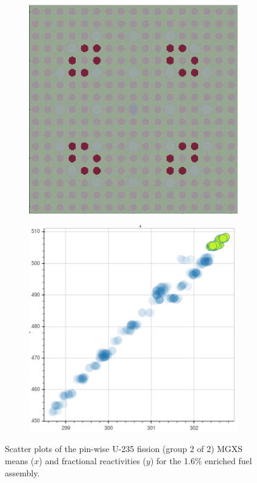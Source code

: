 \begin{figure}[h!]
\begin{subfigure}{0.45\textwidth}
  \caption{}
  \label{fig:chap10-fiss-mean-pcm-mgxs-2}
\end{subfigure}
\begin{subfigure}{0.45\textwidth}
  \centering
  \includegraphics[width=0.9\linewidth]{figures/unsupervised/features/assm-16/u235-fiss/mean-pcm/geometry-3}
  \caption{}
  \label{fig:chap10-fiss-mean-pcm-geom-3}
\end{subfigure}%
\begin{subfigure}{0.45\textwidth}
  \centering
  \includegraphics[width=0.9\linewidth]{figures/unsupervised/features/assm-16/u235-fiss/mean-pcm/mgxs-3}
  \caption{}
  \label{fig:chap10-fiss-mean-pcm-mgxs-3}
\end{subfigure}
\caption[Clustering of U-235 fission MGXS fractional reactivities]{Scatter plots of the pin-wise U-235 fission (group 2 of 2) \ac{MGXS} means ($x$) and fractional reactivities ($y$) for the 1.6\% enriched fuel assembly.}
\label{fig:chap10-mean-pcm}
\end{figure}

